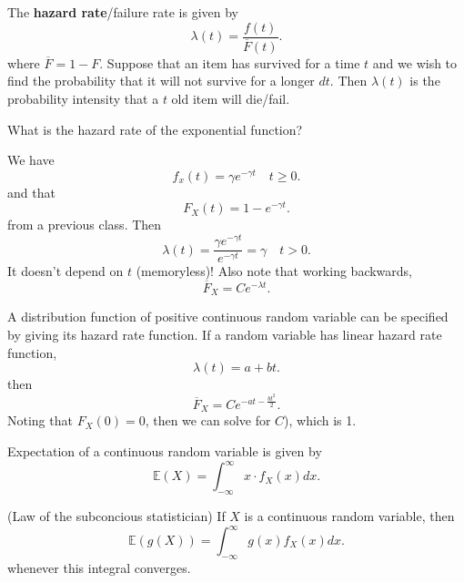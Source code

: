 
\begin{definition}
	The \textbf{hazard rate}/failure rate is given by \[
		\lambda (t) = \frac{f(t)}{\overline{F}(t)}
	.\] where \( \overline{F} = 1 - F \). Suppose that an item has survived for a time \( t \) and we wish to find the probability that it will not survive for a longer \( dt \). Then \( \lambda (t) \) is the probability intensity that a \( t \) old item will die/fail.
\end{definition}

\begin{eg}
	What is the hazard rate of the exponential function?
\end{eg}
\begin{explanation}
	We have \[
		f_x(t) = \gamma e^{-\gamma t}  \quad t \ge 0
	.\] and that \[
		F_X(t) = 1 - e^{-\gamma t} 
	.\] from a previous class. Then \[
		\lambda (t) = \frac{\gamma e^{-\gamma t} }{e^{-\gamma t} } = \gamma \quad  t > 0
	.\] It doesn't depend on \( t \) (memoryless)! Also note that working backwards, \[
		\overline{F}_X = Ce^{-\lambda t} 
	.\] 
\end{explanation}

\begin{eg}
	A distribution function of positive continuous random variable can be specified by giving its hazard rate function. If a random variable has linear hazard rate function, \[
		\lambda (t) = a + bt
	.\] then \[
		\overline{F}_X = Ce^{-at - \frac{bt ^{2} }{2}}  
	.\] Noting that \( F_X(0) = 0 \), then we can solve for \( C \)), which is 1.
\end{eg}

\begin{definition}
	Expectation of a continuous random variable is given by \[
		\mathbb{E}(X) = \int_{-\infty}^{\infty}x\cdot f_X(x)dx 
	.\] 
\end{definition}

\begin{theorem}
	(Law of the subconcious statistician) If \( X \) is a continuous random variable, then \[
		\mathbb{E}(g(X)) = \int_{-\infty}^{\infty}g(x)f_X(x)dx 
	.\] whenever this integral converges.
\end{theorem}
